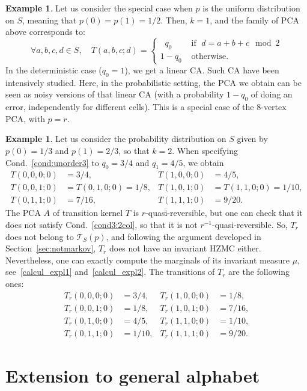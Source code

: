 \documentclass[10pt]{amsart}
\theoremstyle{definition}\newtheorem{defi}[theo]{Definition}\newtheorem{rema}[theo]{Remark}\newtheorem{exam}[theo]{Example}\newtheorem{exem}[theo]{Example}\newtheorem{nota}[theo]{Notation}
\newcounter{a}
\newcommand{\Cond}{Cond.}
\newcommand{\triang}[2]{\mathcal{T}_{#1} \left(#2 \right)}
\let\oldforall\forall
\renewcommand*{\forall}{\mathrel{\oldforall}}
\begin{document}
\begin{exam}
Let us consider the special case when $p$ is the uniform distribution on $S$, meaning that $p(0)=p(1)=1/2$. Then, $k=1$, and the family of PCA above corresponds to:
\[
\forall a,b,c,d\in S, \quad T(a,b,c;d)=
\begin{cases}
\;\; q_0  &\text{ if } \; d=a+b+c \mod 2\\
1-q_0  &\text{ otherwise. }
\end{cases}
\]
In the deterministic case ($q_0=1$), we get a linear CA. Such CA have been intensively studied. Here, in the probabilistic setting, the PCA we obtain can be seen as noisy versions of that linear CA (with a probability $1-q_0$ of doing an error, independently for different cells). This is a special case of the $8$-vertex PCA, with $p=r$.
\end{exam}

\begin{exam}\label{exemple:binaire}
Let us consider the probability distribution on $S$ given by $p(0) = 1/3$ and $p(1) = 2/3$, so that $k=2$. When specifying \Cond~\ref{cond:unorder3} to $q_0=3/4$ and $q_1 = 4/5$, we obtain
\begin{align*}
T(0,0,0;0) &= 3/4, & T(1,0,0;0) &= 4/5,\\
T(0,0,1;0) &= T(0,1,0;0) = 1/8, & T(1,0,1;0) &= T(1,1,0;0) = 1/10,\\
T(0,1,1;0) &= 7/16, & T(1,1,1;0) &= 9/20.
\end{align*}
The PCA $A$ of transition kernel $T$ is $r$-quasi-reversible, but one can check that it does not satisfy \Cond~\ref{cond3:2col}, so that it is not $r^{-1}$-quasi-reversible. So, $T_r$ does not belong to $\triang{S}{p}$, and following the argument developed in Section~\ref{sec:notmarkov}, $T_r$ does not have an invariant HZMC either. Nevertheless, one can exactly compute the marginals of its invariant measure $\mu$, see~\eqref{calcul_expl1} and~\eqref{calcul_expl2}. The transitions of $T_r$ are the following ones:
\begin{align*}
T_r(0,0,0;0) &= 3/4,& T_r(1,0,0;0) &= 1/8,\\
T_r(0,0,1;0) &= 1/8,& T_r(1,0,1;0) &= 7/16,\\
T_r(0,1,0;0) &= 4/5,& T_r(1,1,0;0) &= 1/10,\\
T_r(0,1,1;0) &= 1/10,& T_r(1,1,1;0) &= 9/20.
\end{align*}
\end{exam}


\section{Extension to general alphabet} \label{sec:general}
\end{document}
